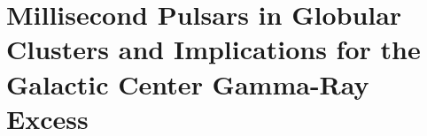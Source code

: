 %
\section{Millisecond Pulsars in Globular Clusters and Implications for the Galactic Center Gamma-Ray Excess}
\label{sec:msp_paper}










\begin{subappendices}


\end{subappendices}
